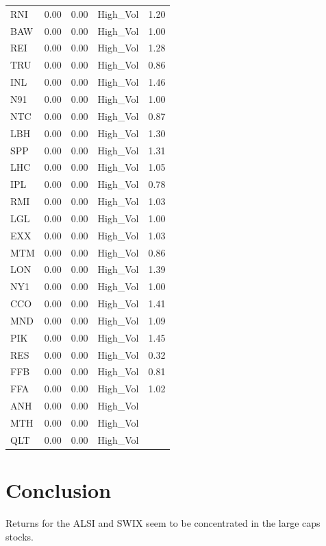 \documentclass[11pt,preprint, authoryear]{elsarticle}
\numberwithin{equation}{section}
\numberwithin{figure}{section}
\numberwithin{table}{section}
\begin{document}
\begin{longtable}{lrrlr}
  RNI & 0.00 & 0.00 & High\_Vol & 1.20 \\ 
  BAW & 0.00 & 0.00 & High\_Vol & 1.00 \\ 
  REI & 0.00 & 0.00 & High\_Vol & 1.28 \\ 
  TRU & 0.00 & 0.00 & High\_Vol & 0.86 \\ 
  INL & 0.00 & 0.00 & High\_Vol & 1.46 \\ 
  N91 & 0.00 & 0.00 & High\_Vol & 1.00 \\ 
  NTC & 0.00 & 0.00 & High\_Vol & 0.87 \\ 
  LBH & 0.00 & 0.00 & High\_Vol & 1.30 \\ 
  SPP & 0.00 & 0.00 & High\_Vol & 1.31 \\ 
  LHC & 0.00 & 0.00 & High\_Vol & 1.05 \\ 
  IPL & 0.00 & 0.00 & High\_Vol & 0.78 \\ 
  RMI & 0.00 & 0.00 & High\_Vol & 1.03 \\ 
  LGL & 0.00 & 0.00 & High\_Vol & 1.00 \\ 
  EXX & 0.00 & 0.00 & High\_Vol & 1.03 \\ 
  MTM & 0.00 & 0.00 & High\_Vol & 0.86 \\ 
  LON & 0.00 & 0.00 & High\_Vol & 1.39 \\ 
  NY1 & 0.00 & 0.00 & High\_Vol & 1.00 \\ 
  CCO & 0.00 & 0.00 & High\_Vol & 1.41 \\ 
  MND & 0.00 & 0.00 & High\_Vol & 1.09 \\ 
  PIK & 0.00 & 0.00 & High\_Vol & 1.45 \\ 
  RES & 0.00 & 0.00 & High\_Vol & 0.32 \\ 
  FFB & 0.00 & 0.00 & High\_Vol & 0.81 \\ 
  FFA & 0.00 & 0.00 & High\_Vol & 1.02 \\ 
  ANH & 0.00 & 0.00 & High\_Vol &  \\ 
  MTH & 0.00 & 0.00 & High\_Vol &  \\ 
  QLT & 0.00 & 0.00 & High\_Vol &  \\ 
   \bottomrule
\end{longtable}
\endgroup

\hypertarget{conclusion}{%
\section{Conclusion}\label{conclusion}}

Returns for the ALSI and SWIX seem to be concentrated in the large caps
stocks.


\end{document}
